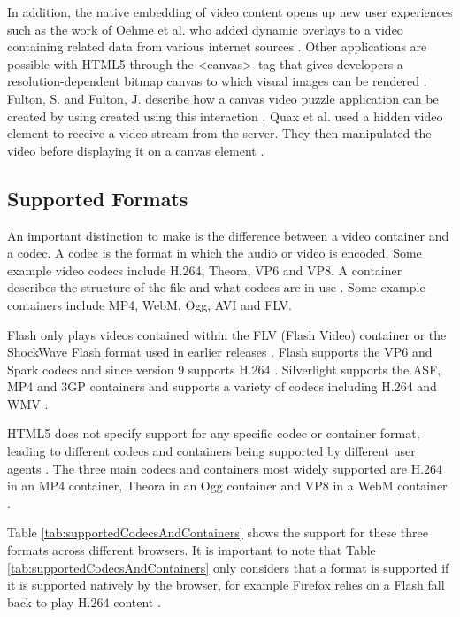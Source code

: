 \documentclass[journal]{IEEEtran}
\begin{document}
In addition, the native embedding of video content opens up new user experiences such as the work of Oehme et al. who added dynamic overlays to a video containing related data from various internet sources \cite{inproceedings:theChroomaApproach}. Other applications are possible with HTML5 through the \textless canvas\textgreater~tag that gives developers a resolution-dependent bitmap canvas to which visual images can be rendered \cite{standard:html5}. Fulton, S. and Fulton, J. describe how a canvas video puzzle application can be created by using created using this interaction \cite{book:html5canvas}. Quax et al. used a hidden video element to receive a video stream from the server. They then manipulated the video before displaying it on a canvas element \cite{inproceedings:aPracticalAndScableMethodForStreaming}.

\subsection{Supported Formats}
An important distinction to make is the difference between a video container and a codec. A codec is the format in which the audio or video is encoded. Some example video codecs include H.264, Theora, VP6 and VP8. A container describes the structure of the file and what codecs are in use \cite{website:videoFormatsGuide}. Some example containers include MP4, WebM, Ogg, AVI and FLV.

Flash only plays videos contained within the FLV (Flash Video) container or the ShockWave Flash format used in earlier releases \cite{article:flashPlayer}. Flash supports the VP6 and Spark codecs and since version 9 supports H.264 \cite{article:flashPlayer}\cite{website:flashSupportedFormats}. Silverlight supports the ASF, MP4 and 3GP containers and supports a variety of codecs including H.264 and WMV \cite{website:silverlightSupportedFormats}.

HTML5 does not specify support for any specific codec or container format, leading to different codecs and containers being supported by different user agents \cite{article:towardsVideoOnTheWebWithHTML5}. The three main codecs and containers most widely supported are H.264 in an MP4 container, Theora in an Ogg container and VP8 in a WebM container \cite{article:towardsVideoOnTheWebWithHTML5}.

Table \ref{tab:supportedCodecsAndContainers} shows the support for these three formats across different browsers. It is important to note that Table \ref{tab:supportedCodecsAndContainers} only considers that a format is supported if it is supported natively by the browser, for example Firefox relies on a Flash fall back to play H.264 content \cite{website:firefoxVideoMobileAndTheOpenWeb}.
\end{document}
